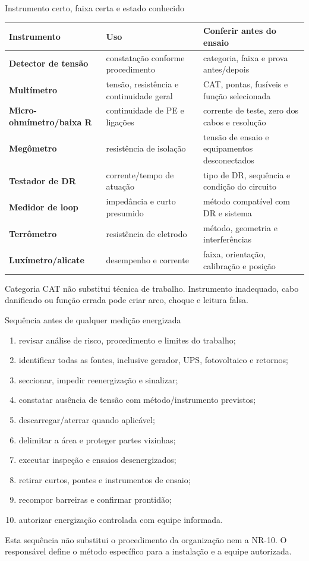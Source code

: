 \begin{frame}{Instrumento certo, faixa certa e estado conhecido}
\scriptsize
\begin{tabularx}{\textwidth}{>{\bfseries}p{2.6cm}X X}
\toprule
Instrumento & Uso & Conferir antes do ensaio \\
\midrule
Detector de tensão & constatação conforme procedimento & categoria, faixa e prova antes/depois \\
Multímetro & tensão, resistência e continuidade geral & CAT, pontas, fusíveis e função selecionada \\
Micro-ohmímetro/baixa R & continuidade de PE e ligações & corrente de teste, zero dos cabos e resolução \\
Megômetro & resistência de isolação & tensão de ensaio e equipamentos desconectados \\
Testador de DR & corrente/tempo de atuação & tipo de DR, sequência e condição do circuito \\
Medidor de loop & impedância e curto presumido & método compatível com DR e sistema \\
Terrômetro & resistência de eletrodo & método, geometria e interferências \\
Luxímetro/alicate & desempenho e corrente & faixa, orientação, calibração e posição \\
\bottomrule
\end{tabularx}
\begin{caixaAt}
Categoria CAT não substitui técnica de trabalho. Instrumento inadequado, cabo danificado ou função errada pode criar arco, choque e leitura falsa.
\end{caixaAt}
\end{frame}

\begin{frame}{Sequência antes de qualquer medição energizada}
\scriptsize
\begin{enumerate}
\item revisar análise de risco, procedimento e limites do trabalho;
\item identificar todas as fontes, inclusive gerador, UPS, fotovoltaico e retornos;
\item seccionar, impedir reenergização e sinalizar;
\item constatar ausência de tensão com método/instrumento previstos;
\item descarregar/aterrar quando aplicável;
\item delimitar a área e proteger partes vizinhas;
\item executar inspeção e ensaios desenergizados;
\item retirar curtos, pontes e instrumentos de ensaio;
\item recompor barreiras e confirmar prontidão;
\item autorizar energização controlada com equipe informada.
\end{enumerate}
\begin{caixaAt}
Esta sequência não substitui o procedimento da organização nem a NR-10. O responsável define o método específico para a instalação e a equipe autorizada.
\end{caixaAt}
\end{frame}


